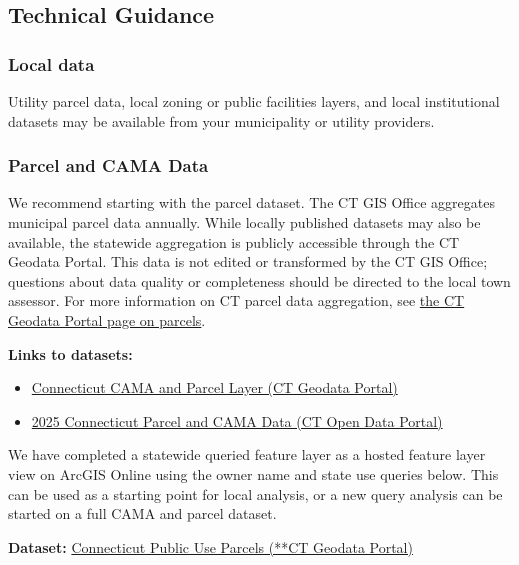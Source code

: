 \documentclass[
  letterpaper,
  DIV=11,
  numbers=noendperiod]{scrreprt}
\providecommand{\tightlist}{%
  \setlength{\itemsep}{0pt}\setlength{\parskip}{0pt}}
\begin{document}
\subsection{Technical Guidance}\label{technical-guidance}

\subsubsection{Local data}\label{sec-local-data}

Utility parcel data, local zoning or public facilities layers, and local
institutional datasets may be available from your municipality or
utility providers.

\subsubsection{Parcel and CAMA Data}\label{sec-parcel-and-cama-data}

We recommend starting with the parcel dataset. The CT GIS Office
aggregates municipal parcel data annually. While locally published
datasets may also be available, the statewide aggregation is publicly
accessible through the CT Geodata Portal. This data is not edited or
transformed by the CT GIS Office; questions about data quality or
completeness should be directed to the local town assessor. For more
information on CT parcel data aggregation, see
\href{https://geodata.ct.gov/pages/parcels}{the CT Geodata Portal page
on parcels}.

\textbf{Links to datasets:}

\begin{itemize}
\tightlist
\item
  \href{https://geodata.ct.gov/datasets/ctmaps::connecticut-cama-and-parcel-layer/about}{Connecticut
  CAMA and Parcel Layer (CT Geodata Portal)}
\item
  \href{https://data.ct.gov/Local-Government/2025-Connecticut-Parcel-and-CAMA-Data/rny9-6ak2/about_data}{2025
  Connecticut Parcel and CAMA Data (CT Open Data Portal)}
\end{itemize}

We have completed a statewide queried feature layer as a hosted feature
layer view on ArcGIS Online using the owner name and state use queries
below. This can be used as a starting point for local analysis, or a new
query analysis can be started on a full CAMA and parcel dataset.

\textbf{Dataset:}
\href{https://ctmaps.maps.arcgis.com/home/item.html?id=ee917ce4b44d488cbba7df730b8583dc}{Connecticut
Public Use Parcels (**CT Geodata Portal)}
\end{document}
